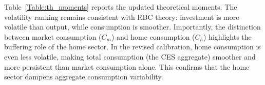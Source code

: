\documentclass[a4paper,12pt]{article} %
\theoremstyle{nonitalic}
\begin{document}


Table~\ref{Table:th_moments} reports the updated theoretical moments.
The volatility ranking remains consistent with RBC theory: investment is more volatile than output,
while consumption is smoother. Importantly, the distinction between market consumption ($C_m$) and home consumption ($C_h$)
highlights the buffering role of the home sector. In the revised calibration, home consumption is even less volatile,
making total consumption (the CES aggregate) smoother and more persistent than market consumption alone.
This confirms that the home sector dampens aggregate consumption variability.




% 
\end{document}
